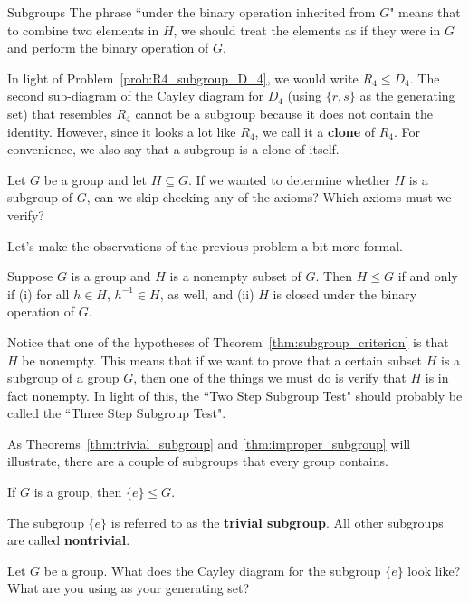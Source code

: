 \begin{section}{Subgroups}
The phrase ``under the binary operation inherited from $G$" means that to combine two elements in $H$, we should treat the elements as if they were in $G$ and perform the binary operation of $G$.

In light of Problem~\ref{prob:R4_subgroup_D_4}, we would write $R_4\leq D_4$.  The second sub-diagram of the Cayley diagram for $D_4$ (using $\{r,s\}$ as the generating set) that resembles $R_4$ cannot be a subgroup because it does not contain the identity.  However, since it looks a lot like $R_4$, we call it a \textbf{clone} of $R_4$. For convenience, we also say that a subgroup is a clone of itself.

\begin{problem}\label{prob:informal_subgroup_criterion}
Let $G$ be a group and let $H\subseteq G$. If we wanted to determine whether $H$ is a subgroup of $G$, can we skip checking any of the axioms? Which axioms must we verify?
\end{problem}

Let's make the observations of the previous problem a bit more formal.

\begin{theorem}\label{thm:subgroup_criterion}
Suppose $G$ is a group and $H$ is a nonempty subset of $G$.  Then $H\leq G$ if and only if (i) for all $h\in H$, $h^{-1} \in H$, as well, and (ii) $H$ is closed under the binary operation of $G$.
\end{theorem}

Notice that one of the hypotheses of Theorem~\ref{thm:subgroup_criterion} is that $H$ be nonempty.  This means that if we want to prove that a certain subset $H$ is a subgroup of a group $G$, then one of the things we must do is verify that $H$ is in fact nonempty. In light of this, the ``Two Step Subgroup Test" should probably be called the ``Three Step Subgroup Test".

As Theorems~\ref{thm:trivial_subgroup} and \ref{thm:improper_subgroup} will illustrate, there are a couple of subgroups that every group contains.

\begin{theorem}\label{thm:trivial_subgroup}
If $G$ is a group, then $\{e\}\leq G$.
\end{theorem}

The subgroup $\{e\}$ is referred to as the \textbf{trivial subgroup}.  All other subgroups are called \textbf{nontrivial}.

\begin{problem}
Let $G$ be a group. What does the Cayley diagram for the subgroup $\{e\}$ look like? What are you using as your generating set?
\end{problem}


\end{section}
